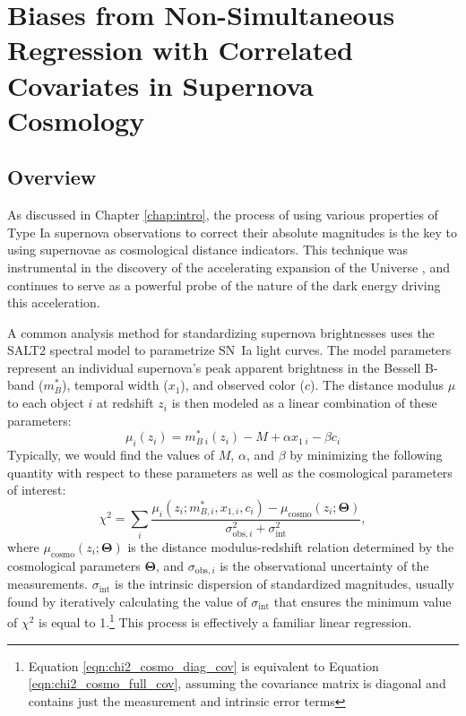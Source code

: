 \chapter{Biases from Non-Simultaneous Regression with Correlated Covariates in Supernova Cosmology}
\label{chap:reg_bias}

\newcommand{\sgn}{\text{sgn}}

\section{Overview} \label{sec:intro}
As discussed in Chapter \ref{chap:intro}, the process of using various properties of Type Ia supernova observations to correct their absolute magnitudes is the key to using supernovae as cosmological distance indicators. This technique was instrumental in the discovery of the accelerating expansion of the Universe \citep{perlmutter_measurements_1999, riess_observational_1998}, and continues to serve as a powerful probe of the nature of the dark energy driving this acceleration.

A common analysis method for standardizing supernova brightnesses uses the SALT2 spectral model \citep{guy_salt2_2007, betoule_improved_2014, mosher_cosmological_2014} to parametrize SN~Ia light curves. The model parameters represent an individual supernova's peak apparent brightness in the Bessell B-band ($m_B^*$), temporal width ($x_1$), and observed color ($c$). The distance modulus $\mu$ to each object $i$ at redshift $z_i$ is then modeled as a linear combination of these parameters:
\begin{equation}
    \mu_i(z_i) = m_{B\;i}^*(z_i) - M + \alpha x_{1\;i} - \beta c_i
    \label{eqn:salt_mu}
\end{equation}
Typically, we would find the values of $M$, $\alpha$, and $\beta$ by minimizing the following quantity with respect to these parameters as well as the cosmological parameters of interest:
\begin{equation}
    \chi^2 = \displaystyle\sum_{i} \frac{\mu_i(z_i; m_{B, i}^*, x_{1,i}, c_i)-\mu_\text{cosmo}(z_i; \bm{\Theta})}{\sigma_{\text{obs},i}^2+\sigma_\text{int}^2},
    \label{eqn:chi2_cosmo_diag_cov}
\end{equation}
where $\mu_\text{cosmo}(z_i;\bm{\Theta})$ is the distance modulus-redshift relation determined by the cosmological parameters $\bm{\Theta}$, and $\sigma_{\text{obs}, i}$ is the observational uncertainty of the measurements. $\sigma_\text{int}$ is the intrinsic dispersion of standardized magnitudes, usually found by iteratively calculating the value of $\sigma_\text{int}$ that ensures the minimum value of $\chi^2$ is equal to 1.\footnote{Equation \ref{eqn:chi2_cosmo_diag_cov} is equivalent to Equation \ref{eqn:chi2_cosmo_full_cov}, assuming the covariance matrix is diagonal and contains just the measurement and intrinsic error terms} This process is effectively a familiar linear regression.

